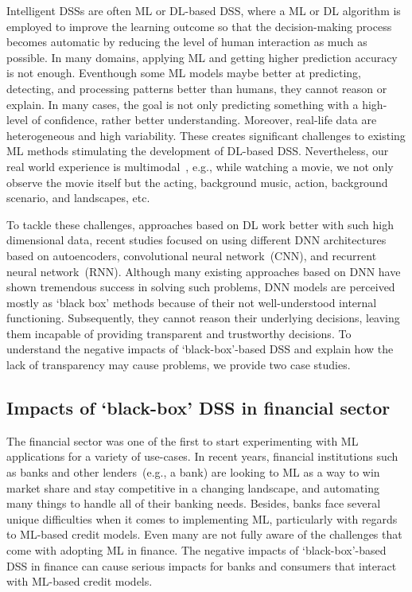 \hspace*{3.5mm} Intelligent DSSs are often ML or DL-based DSS, where a ML or DL algorithm is employed to improve the learning outcome so that the decision-making process becomes automatic by reducing the level of human interaction as much as possible. In many domains, applying ML and getting higher prediction accuracy is not enough. Eventhough some ML models maybe better at predicting, detecting, and processing patterns better than humans, they cannot reason or explain. In many cases, the goal is not only predicting something with a high-level of confidence, rather better understanding. Moreover, real-life data are heterogeneous and high variability. These creates significant challenges to existing ML methods stimulating the development of DL-based DSS. Nevertheless, our real world experience is multimodal~\cite{mmsurvey}, e.g., while watching a movie, we not only observe the movie itself but the acting, background music, action, background scenario, and landscapes, etc. 

\hspace*{3.5mm} To tackle these challenges, approaches based on DL work better with such high dimensional data, recent studies focused on using different DNN architectures based on autoencoders, convolutional neural network~(CNN), and recurrent neural network~(RNN). Although many existing approaches based on DNN have shown tremendous success in solving such problems, DNN models are perceived mostly as `black box' methods because of their not well-understood internal functioning. Subsequently, they cannot reason their underlying decisions, leaving them incapable of providing transparent and trustworthy decisions. 
To understand the negative impacts of `black-box'-based DSS and explain how the lack of transparency may cause problems, we provide two case studies. 

\subsection{Impacts of `black-box' DSS in financial sector}
The financial sector was one of the first to start experimenting with ML applications for a variety of use-cases. In recent years, financial institutions such as banks and other lenders~(e.g., a bank) are looking to ML as a way to win market share and stay competitive in a changing landscape, and automating many things to handle all of their banking needs. Besides, banks face several unique difficulties when it comes to implementing ML, particularly with regards to ML-based credit models. Even many are not fully aware of the challenges that come with adopting ML in finance. The negative impacts of `black-box'-based DSS in finance can cause serious impacts for banks and consumers that interact with ML-based credit models.


